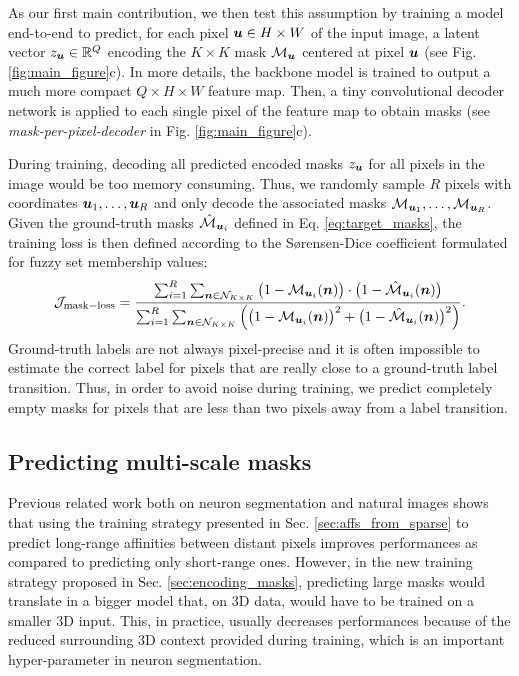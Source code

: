 As our first main contribution, we then test this assumption by training a model end-to-end to predict, for each pixel $\coord{u}\in H\times W$ of the input image, a latent vector $z_{\coord{u}}\in \mathbb{R}^Q$ encoding the $K \times K$ \maskname mask $\mathcal{M}_{\coord{u}}$ centered at pixel $\coord{u}$ (see Fig. \ref{fig:main_figure}c). 
In more details, the backbone model is trained to output a much more compact $Q\times H\times W$ feature map. 
Then, a tiny convolutional decoder network is applied to each single pixel of the feature map to obtain \maskname masks (see \emph{mask-per-pixel-decoder} in Fig. \ref{fig:main_figure}c).

During training, decoding all predicted encoded masks $z_{\coord{u}}$ for all pixels in the image would be too memory consuming. Thus, we randomly sample $R$ pixels with coordinates $\coord{u}_1, \ldots, \coord{u}_R$ and only decode the associated masks $\mathcal{M}_{\coord{u}_1}, \ldots, \mathcal{M}_{\coord{u}_R}$. 
Given the ground-truth \maskname masks $\hat{\mathcal{M}}_{\coord{u}_i}$ defined in Eq. \ref{eq:target_masks}, the training loss is then defined according to the S\o rensen-Dice coefficient formulated for fuzzy set membership values:
\begin{equation}
\mathcal{J}_{\mathrm{mask-loss}} = \frac{\sum_{i=1}^R \sum_{\coord{n} \in \mathcal{N}_{K\times K}} \big(1-\mathcal{M}_{\coord{u}_i}(\coord{n})\big)\cdot \big(1-\hat{\mathcal{M}}_{\coord{u}_i}(\coord{n})\big)}{\sum_{i=1}^R \sum_{\coord{n}\in \mathcal{N}_{K\times K}} \Big( \big(1-\mathcal{M}_{\coord{u}_i}(\coord{n})\big)^2 + \big(1-\hat{\mathcal{M}}_{\coord{u}_i}(\coord{n})\big)^2 \Big)}.
\end{equation} 
Ground-truth labels are not always pixel-precise and it is often impossible to estimate the correct label for pixels that are really close to a ground-truth label transition. Thus, in order to avoid noise during training, we predict completely empty masks for pixels that are less than two pixels away from a label transition. 


\subsection{Predicting multi-scale \maskname masks}\label{sec:multiscale_patches}
Previous related work both on neuron segmentation \cite{lee2017superhuman} and natural images \cite{liu2018affinity,Gao_2019_ICCV} shows that using the training strategy presented in Sec. \ref{sec:affs_from_sparse} to predict long-range affinities between distant pixels improves performances as compared to predicting only short-range ones. However, in the new training strategy proposed in Sec. \ref{sec:encoding_masks}, predicting large \maskname masks would translate in a bigger model that, on 3D data, would have to be trained on a smaller 3D input.
This, in practice, usually decreases performances because of the reduced surrounding 3D context provided during training, which is an important hyper-parameter in neuron segmentation.

